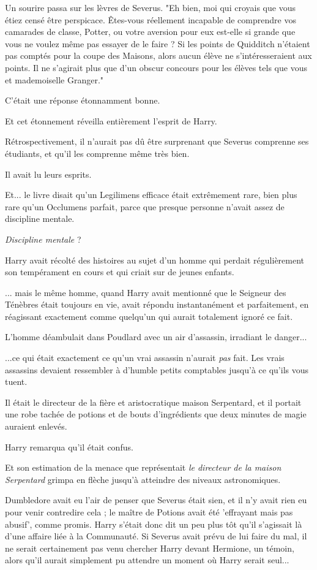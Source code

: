 Un sourire passa sur les lèvres de Severus. "Eh bien, moi qui croyais que vous étiez censé être perspicace. Êtes-vous réellement incapable de comprendre vos camarades de classe, Potter, ou votre aversion pour eux est-elle si grande que vous ne voulez même pas essayer de le faire ? Si les points de Quidditch n'étaient pas comptés pour la coupe des Maisons, alors aucun élève ne s'intéresseraient aux points. Il ne s'agirait plus que d'un obscur concours pour les élèves tels que vous et mademoiselle Granger."

C'était une réponse étonnamment bonne.

Et cet étonnement réveilla entièrement l'esprit de Harry.

Rétrospectivement, il n'aurait pas dû être surprenant que Severus comprenne ses étudiants, et qu'il les comprenne même très bien.

Il avait lu leurs esprits.

Et... le livre disait qu'un Legilimens efficace était extrêmement rare, bien plus rare qu'un Occlumens parfait, parce que presque personne n'avait assez de discipline mentale.

\emph{Discipline mentale}  ?

Harry avait récolté des histoires au sujet d'un homme qui perdait régulièrement son tempérament en cours et qui criait sur de jeunes enfants.

... mais le même homme, quand Harry avait mentionné que le Seigneur des Ténèbres était toujours en vie, avait répondu instantanément et parfaitement, en réagissant exactement comme quelqu'un qui aurait totalement ignoré ce fait.

L'homme déambulait dans Poudlard avec un air d'assassin, irradiant le danger...

...ce qui était exactement ce qu'un vrai assassin n'aurait \emph{pas } fait. Les vrais assassins devaient ressembler à d'humble petits comptables jusqu'à ce qu'ils vous tuent.

Il était le directeur de la fière et aristocratique maison Serpentard, et il portait une robe tachée de potions et de bouts d'ingrédients que deux minutes de magie auraient enlevés.

Harry remarqua qu'il était confus.

Et son estimation de la menace que représentait \emph{le directeur de la maison Serpentard}  grimpa en flèche jusqu'à atteindre des niveaux astronomiques.

Dumbledore avait eu l'air de penser que Severus était sien, et il n'y avait rien eu pour venir contredire cela ; le maître de Potions avait été 'effrayant mais pas abusif', comme promis. Harry s'était donc dit un peu plus tôt qu'il s'agissait là d'une affaire liée à la Communauté. Si Severus avait prévu de lui faire du mal, il ne serait certainement pas venu chercher Harry devant Hermione, un témoin, alors qu'il aurait simplement pu attendre un moment où Harry serait seul...

